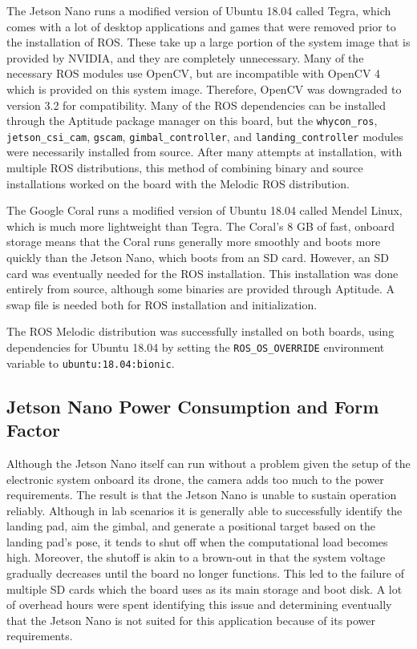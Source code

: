 The Jetson Nano runs a modified version of Ubuntu 18.04 called Tegra, which comes with a lot of desktop applications and games that were removed prior to the installation of ROS. These take up a large portion of the system image that is provided by NVIDIA, and they are completely unnecessary. Many of the necessary ROS modules use OpenCV, but are incompatible with OpenCV 4 which is provided on this system image. Therefore, OpenCV was downgraded to version 3.2 for compatibility. Many of the ROS dependencies can be installed through the Aptitude package manager on this board, but the \texttt{whycon\_ros}, \texttt{jetson\_csi\_cam}, \texttt{gscam}, \texttt{gimbal\_controller}, and \texttt{landing\_controller} modules were necessarily installed from source. After many attempts at installation, with multiple ROS distributions, this method of combining binary and source installations worked on the board with the Melodic ROS distribution.

The Google Coral runs a modified version of Ubuntu 18.04 called Mendel Linux, which is much more lightweight than Tegra. The Coral's 8 GB of fast, onboard storage means that the Coral runs generally more smoothly and boots more quickly than the Jetson Nano, which boots from an SD card. However, an SD card was eventually needed for the ROS installation. This installation was done entirely from source, although some binaries are provided through Aptitude. A swap file is needed both for ROS installation and initialization.

The ROS Melodic distribution was successfully installed on both boards, using dependencies for Ubuntu 18.04 by setting the \texttt{ROS\_OS\_OVERRIDE} environment variable to \texttt{ubuntu:18.04:bionic}.

\subsection{Jetson Nano Power Consumption and Form Factor}
\label{section:jetson_nano_power_consumption_and_form_factor}

Although the Jetson Nano itself can run without a problem given the setup of the electronic system onboard its drone, the camera adds too much to the power requirements. The result is that the Jetson Nano is unable to sustain operation reliably. Although in lab scenarios it is generally able to successfully identify the landing pad, aim the gimbal, and generate a positional target based on the landing pad's pose, it tends to shut off when the computational load becomes high. Moreover, the shutoff is akin to a brown-out in that the system voltage gradually decreases until the board no longer functions. This led to the failure of multiple SD cards which the board uses as its main storage and boot disk. A lot of overhead hours were spent identifying this issue and determining eventually that the Jetson Nano is not suited for this application because of its power requirements.

